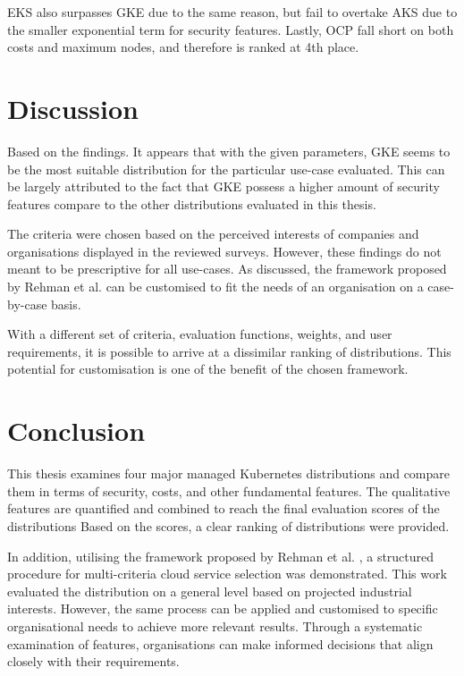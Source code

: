 EKS also surpasses GKE due to the same reason, but fail to overtake AKS due to the smaller exponential term for security features. Lastly, OCP fall short on both costs and maximum nodes, and therefore is ranked at 4th place.

\chapter{Discussion}\label{discussion}

Based on the findings. It appears that with the given parameters, GKE seems to be the most suitable distribution for the particular use-case evaluated. This can be largely attributed to the fact that GKE possess a higher amount of security features compare to the other distributions evaluated in this thesis.

The criteria were chosen based on the perceived interests of companies and organisations displayed in the reviewed surveys. However, these findings do not meant to be prescriptive for all use-cases. As discussed, the framework proposed by Rehman et al. \cite{5976164} can be customised to fit the needs of an organisation on a case-by-case basis.

With a different set of criteria, evaluation functions, weights, and user requirements, it is possible to arrive at a dissimilar ranking of distributions. This potential for customisation is one of the benefit of the chosen framework.

\chapter{Conclusion}\label{conclusion}

This thesis examines four major managed Kubernetes distributions and compare them in terms of security, costs, and other fundamental features. The qualitative features are quantified and combined to reach the final evaluation scores of the distributions Based on the scores, a clear ranking of distributions were provided.

In addition, utilising the framework proposed by Rehman et al. \cite{5976164}, a structured procedure for multi-criteria cloud service selection was demonstrated. This work evaluated the distribution on a general level based on projected industrial interests. However, the same process can be applied and customised to specific organisational needs to achieve more relevant results. Through a systematic examination of features, organisations can make informed decisions that align closely with their requirements.


